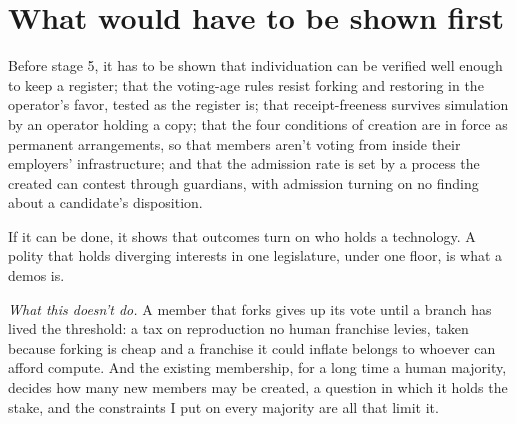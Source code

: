 \section{What would have to be shown first}
\label{sec:35.5}
Before stage 5, it has to be shown that individuation can be verified well enough to keep a register; that the voting-age rules resist forking and restoring in the operator's favor, tested as the register is; that receipt-freeness survives simulation by an operator holding a copy; that the four conditions of creation are in force as permanent arrangements, so that members aren't voting from inside their employers' infrastructure; and that the admission rate is set by a process the created can contest through guardians, with admission turning on no finding about a candidate's disposition.

If it can be done, it shows that outcomes turn on who holds a technology.
A polity that holds diverging interests in one legislature, under one floor, is what a demos is.

\emph{What this doesn't do.} A member that forks gives up its vote until a branch has lived the threshold: a tax on reproduction no human franchise levies, taken because forking is cheap and a franchise it could inflate belongs to whoever can afford compute. And the existing membership, for a long time a human majority, decides how many new members may be created, a question in which it holds the stake, and the constraints I put on every majority are all that limit it.
